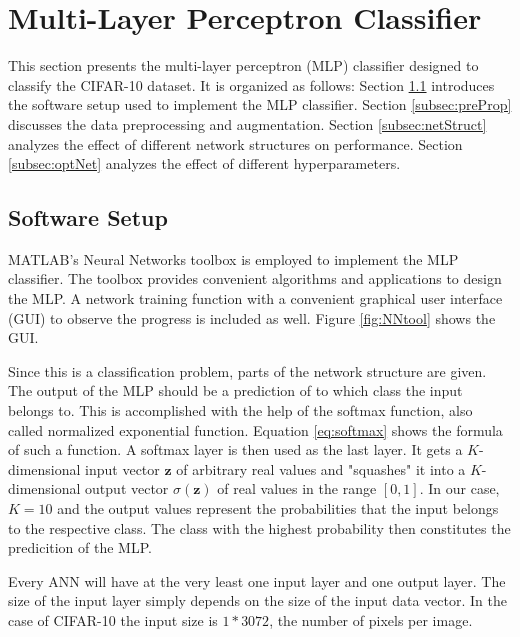 \section{Multi-Layer Perceptron Classifier}\label{sec:MLP}
	    \pagestyle{mario}

This section presents the multi-layer perceptron (MLP) classifier designed to classify the CIFAR-10 dataset. It is organized as follows: Section \ref{subsec:setup} introduces the software setup used to implement the MLP classifier. Section \ref{subsec:preProp} discusses the data preprocessing and augmentation. Section \ref{subsec:netStruct} analyzes the effect of different network structures on performance. Section \ref{subsec:optNet} analyzes the effect of different hyperparameters.

\subsection{Software Setup}\label{subsec:setup}

MATLAB's Neural Networks toolbox is employed to implement the MLP classifier. The toolbox provides convenient algorithms and applications to design the MLP. A network training function with a convenient graphical user interface (GUI) to observe the progress is included as well. Figure \ref{fig:NNtool} shows the GUI.

Since this is a classification problem, parts of the network structure are given. The output of the MLP should be a prediction of to which class the input belongs to. This is accomplished with the help of the softmax function, also called normalized exponential function. Equation \ref{eq:softmax} shows the formula of such a function. A softmax layer is then used as the last layer. It gets a $K$-dimensional input vector $\boldsymbol{z}$ of arbitrary real values and "squashes" it into a $K$-dimensional output vector $\sigma(\boldsymbol{z})$ of real values in the range $[0,1]$. In our case, $K=10$ and the output values represent the probabilities that the input belongs to the respective class. The class with the highest probability then constitutes the predicition of the MLP.

Every ANN will have at the very least one input layer and one output layer. The size of the input layer simply depends on the size of the input data vector. In the case of CIFAR-10 the input size is $1*3072$, the number of pixels per image.

